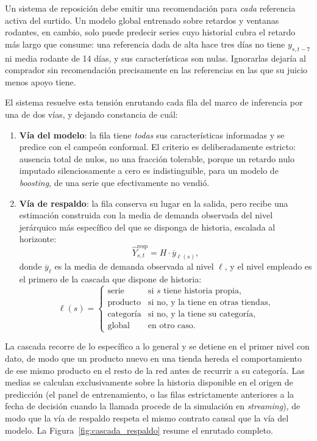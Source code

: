 Un sistema de reposición debe emitir una recomendación para \emph{cada} referencia activa del surtido. Un modelo global entrenado sobre retardos y ventanas rodantes, en cambio, solo puede predecir series cuyo historial cubra el retardo más largo que consume: una referencia dada de alta hace tres días no tiene $y_{s,t-7}$ ni media rodante de 14 días, y sus características son nulas. Ignorarlas dejaría al comprador sin recomendación precisamente en las referencias en las que su juicio menos apoyo tiene.

El sistema resuelve esta tensión enrutando cada fila del marco de inferencia por una de dos vías, y dejando constancia de cuál:

\begin{enumerate}
    \item \textbf{Vía del modelo}: la fila tiene \emph{todas} sus características informadas y se predice con el campeón conformal. El criterio es deliberadamente estricto: ausencia total de nulos, no una fracción tolerable, porque un retardo nulo imputado silenciosamente a cero es indistinguible, para un modelo de \textit{boosting}, de una serie que efectivamente no vendió.
    \item \textbf{Vía de respaldo}: la fila conserva su lugar en la salida, pero recibe una estimación construida con la media de demanda observada del nivel jerárquico más específico del que se disponga de historia, escalada al horizonte:
    \begin{equation}
        \hat{Y}^{\text{resp}}_{s,t} = H \cdot \overline{y}_{\ell(s)},
    \end{equation}
    donde $\overline{y}_{\ell}$ es la media de demanda observada al nivel $\ell$, y el nivel
    empleado es el primero de la cascada que dispone de historia:
    \begin{equation}
        \ell(s) = \begin{cases}
            \text{serie} & \text{si } s \text{ tiene historia propia,}\\
            \text{producto} & \text{si no, y la tiene en otras tiendas,}\\
            \text{categoría} & \text{si no, y la tiene su categoría,}\\
            \text{global} & \text{en otro caso.}
        \end{cases}
    \end{equation}
\end{enumerate}

La cascada recorre de lo específico a lo general y se detiene en el primer nivel con dato, de modo que un producto nuevo en una tienda hereda el comportamiento de ese mismo producto en el resto de la red antes de recurrir a su categoría. Las medias se calculan exclusivamente sobre la historia disponible en el origen de predicción (el panel de entrenamiento, o las filas estrictamente anteriores a la fecha de decisión cuando la llamada procede de la simulación en \textit{streaming}), de modo que la vía de respaldo respeta el mismo contrato causal que la vía del modelo. La Figura~\ref{fig:cascada_respaldo} resume el enrutado completo.

